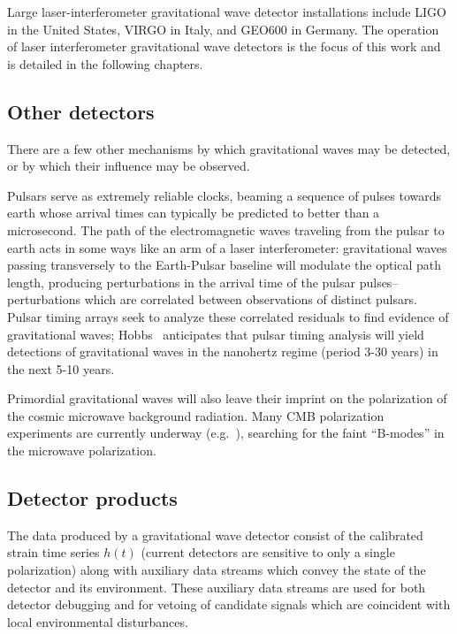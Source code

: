 Large laser-interferometer gravitational wave detector installations
include LIGO\cite{S5InstrumentPaper} in the United States,
VIRGO\cite{Acernese2008Virgo} in Italy, and GEO600\cite{GeoStatus2008}
in Germany.
%
The operation of laser interferometer gravitational wave detectors is
the focus of this work and is detailed in the following chapters.

\subsection{Other detectors}

There are a few other mechanisms by which gravitational waves may be
detected, or by which their influence may be observed.

Pulsars serve as extremely reliable clocks, beaming a sequence of
pulses towards earth whose arrival times can typically be predicted to
better than a microsecond.  The path of the electromagnetic waves
traveling from the pulsar to earth acts in some ways like an arm of a
laser interferometer: gravitational waves passing transversely to the
Earth-Pulsar baseline will modulate the optical path length, producing
perturbations in the arrival time of the pulsar pulses--perturbations
which are correlated between observations of distinct pulsars. Pulsar
timing arrays seek to analyze these correlated residuals to find
evidence of gravitational waves;
Hobbs~\cite{Hobbs2009International} anticipates that pulsar timing
analysis will yield detections of gravitational waves in the nanohertz
regime (period 3-30 years) in the next 5-10 years.

Primordial gravitational waves will also leave their imprint on the
polarization of the cosmic microwave background radiation.  Many CMB
polarization experiments are currently underway
(e.g.~\cite{Filippini2011SPIDER}), searching for the faint ``B-modes''
in the microwave polarization.

\subsection{Detector products}

The data produced by a gravitational wave detector consist of the
calibrated strain time series $h(t)$ (current detectors are sensitive
to only a single polarization) along with auxiliary data streams which
convey the state of the detector and its environment.  These auxiliary
data streams are used for both detector debugging and for vetoing of
candidate signals which are coincident with local environmental
disturbances.

